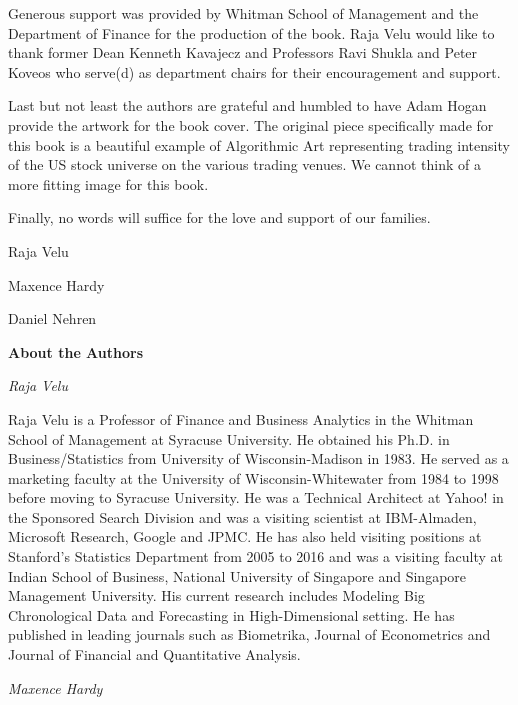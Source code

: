 Generous support was provided by Whitman School of Management and the Department of Finance for the production of the book. Raja Velu would like to thank former Dean Kenneth Kavajecz and Professors Ravi Shukla and Peter Koveos who serve(d) as department chairs for their encouragement and support.

Last but not least the authors are grateful and humbled to have Adam Hogan provide the artwork for the book cover. The original piece specifically made for this book is a beautiful example of  Algorithmic Art representing trading intensity of the US stock universe on the various trading venues. We cannot think of a more fitting image for this book.  


Finally, no words will suffice for the love and support of our families. \vspace{3\baselineskip}


\noindent Raja Velu \par
\noindent Maxence Hardy \par
\noindent Daniel Nehren



\newpage



{\noindent\Large\bfseries About the Authors} \twomedskip

{\noindent\large\itshape Raja Velu} \medbreak

\noindent Raja Velu is a Professor of Finance and Business Analytics in the Whitman School of Management at Syracuse University. He obtained his Ph.D. in Business/Statistics from University of Wisconsin-Madison in 1983. He served as a marketing faculty at the University of Wisconsin-Whitewater from 1984 to 1998 before moving to Syracuse University. He was a Technical Architect at Yahoo! in the Sponsored Search Division and was a visiting scientist at IBM-Almaden, Microsoft Research, Google and JPMC. He has also held visiting positions at Stanford's Statistics Department from 2005 to 2016 and was a visiting faculty at Indian School of Business, National University of Singapore and Singapore Management University. His current research includes Modeling Big Chronological Data and Forecasting in High-Dimensional setting. He has published in leading journals such as Biometrika, Journal of Econometrics and Journal of Financial and Quantitative Analysis. \bigbreak

{\noindent\large\itshape Maxence Hardy} \medbreak

